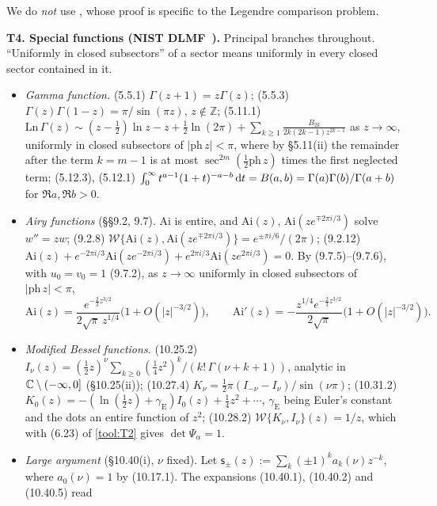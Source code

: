 We do \emph{not} use \cite[Theorem~4.5]{CD}, whose proof is specific to the Legendre comparison problem.

\medskip
\noindent\textbf{T4. Special functions (NIST DLMF~\cite{DLMF}).}
Principal branches throughout. ``Uniformly in closed subsectors'' of a sector means uniformly in every closed sector
contained in it.
\begin{itemize}
\item \emph{Gamma function.} (5.5.1) $\Gamma(z+1)=z\Gamma(z)$; (5.5.3) $\Gamma(z)\Gamma(1-z)=\pi/\sin(\pi z)$,
  $z\notin\mathbb Z$; (5.11.1) $\mathrm{Ln}\,\Gamma(z)\sim(z-\frac12)\ln z-z+\frac12\ln(2\pi)+\sum_{k\ge1}
  \frac{B_{2k}}{2k(2k-1)z^{2k-1}}$ as $z\to\infty$, uniformly in closed subsectors of $|\mathrm{ph}\,z|<\pi$, where by
  \S5.11(ii) the remainder after the term $k=m-1$ is at most $\sec^{2m}(\frac12\mathrm{ph}\,z)$ times the first
  neglected term; (5.12.3), (5.12.1) $\int_0^\infty t^{a-1}(1+t)^{-a-b}\,\mathrm{d} t=B(a,b)=\Gamma(a)\Gamma(b)/\Gamma(a+b)$ for $\Re a,\Re b>0$.
\item \emph{Airy functions} (\S\S9.2, 9.7). $\mathrm{Ai}$ is entire, and $\mathrm{Ai}(z)$, $\mathrm{Ai}(ze^{\mp2\pi i/3})$
  solve $w''=zw$; (9.2.8) $\mathcal W\{\mathrm{Ai}(z),\mathrm{Ai}(ze^{\mp2\pi i/3})\}=e^{\pm\pi i/6}/(2\pi)$; (9.2.12)
  $\mathrm{Ai}(z)+e^{-2\pi i/3}\mathrm{Ai}(ze^{-2\pi i/3})+e^{2\pi i/3}\mathrm{Ai}(ze^{2\pi i/3})=0$. By (9.7.5)--(9.7.6),
  with $u_0=v_0=1$ (9.7.2), as $z\to\infty$ uniformly in closed subsectors of $|\mathrm{ph}\,z|<\pi$,
  \[
    \mathrm{Ai}(z)=\frac{e^{-\frac23z^{3/2}}}{2\sqrt\pi\,z^{1/4}}\bigl(1+O(|z|^{-3/2})\bigr),\qquad
    \mathrm{Ai}'(z)=-\frac{z^{1/4}e^{-\frac23z^{3/2}}}{2\sqrt\pi}\bigl(1+O(|z|^{-3/2})\bigr).
  \]
\item \emph{Modified Bessel functions.} (10.25.2)
  $I_\nu(z)=(\frac12z)^\nu\sum_{k\ge0}(\frac14z^2)^k/(k!\,\Gamma(\nu+k+1))$, analytic in $\mathbb{C}\setminus(-\infty,0]$
  (\S10.25(ii)); (10.27.4) $K_\nu=\frac12\pi(I_{-\nu}-I_\nu)/\sin(\nu\pi)$; (10.31.2)
  $K_0(z)=-(\ln(\frac12z)+\gamma_{\mathrm E})I_0(z)+\frac14z^2+\dotsb$, $\gamma_{\mathrm E}$ being Euler's constant and the
  dots an entire function of $z^2$; (10.28.2) $\mathcal W\{K_\nu,I_\nu\}(z)=1/z$, which with (6.23) of \ref{tool:T2}
  gives $\det\Psi_\alpha=1$.
\item \emph{Large argument} (\S10.40(i), $\nu$ fixed). Let $\mathsf s_\pm(z):=\sum_k(\pm1)^ka_k(\nu)z^{-k}$,
  where $a_0(\nu)=1$ by (10.17.1). The expansions (10.40.1), (10.40.2) and (10.40.5) read
  \begin{align*}

\end{align*}
\end{itemize}
